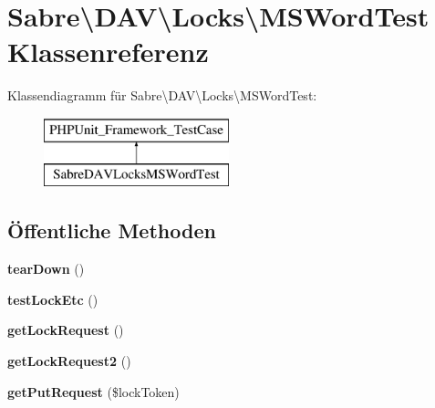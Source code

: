 \hypertarget{class_sabre_1_1_d_a_v_1_1_locks_1_1_m_s_word_test}{}\section{Sabre\textbackslash{}D\+AV\textbackslash{}Locks\textbackslash{}M\+S\+Word\+Test Klassenreferenz}
\label{class_sabre_1_1_d_a_v_1_1_locks_1_1_m_s_word_test}
Klassendiagramm für Sabre\textbackslash{}D\+AV\textbackslash{}Locks\textbackslash{}M\+S\+Word\+Test\+:\begin{figure}[H]
\begin{center}
\leavevmode
\includegraphics[height=2.000000cm]{class_sabre_1_1_d_a_v_1_1_locks_1_1_m_s_word_test}
\end{center}
\end{figure}
\subsection*{Öffentliche Methoden}
\begin{DoxyCompactItemize}
\item 
\mbox{\label{class_sabre_1_1_d_a_v_1_1_locks_1_1_m_s_word_test_a6e578173cbdc68f86e9580cedcc1f8e3}} 
{\bfseries tear\+Down} ()
\item 
\mbox{\label{class_sabre_1_1_d_a_v_1_1_locks_1_1_m_s_word_test_a73e8cf81b2b977786d96b58e8de03323}} 
{\bfseries test\+Lock\+Etc} ()
\item 
\mbox{\label{class_sabre_1_1_d_a_v_1_1_locks_1_1_m_s_word_test_a809be82fd082c8d882cb0bd4e0bd3fb9}} 
{\bfseries get\+Lock\+Request} ()
\item 
\mbox{\label{class_sabre_1_1_d_a_v_1_1_locks_1_1_m_s_word_test_a6e654a9969e4c38e7796f989bd8620b6}} 
{\bfseries get\+Lock\+Request2} ()
\item 
\mbox{\label{class_sabre_1_1_d_a_v_1_1_locks_1_1_m_s_word_test_ab616f22de3bd069056a8ca02a44545c0}} 
{\bfseries get\+Put\+Request} (\$lock\+Token)
\end{DoxyCompactItemize}


